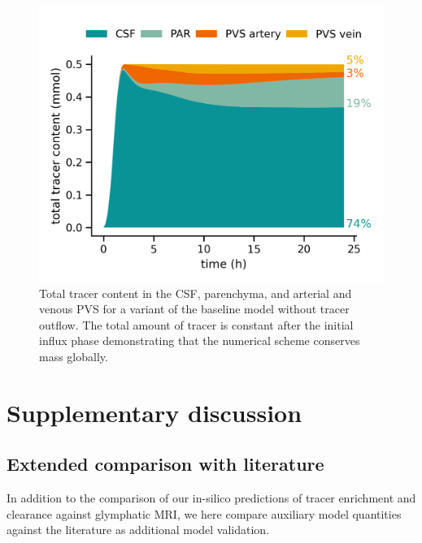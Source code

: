 \documentclass[fleqn,10pt]{wlscirep}
\begin{document}
\begin{figure}
    \centering
    \includegraphics[width=0.5\linewidth]{figures/modelAMassConservation_total_conc.png}
    \caption{Total tracer content in the CSF, parenchyma, and arterial and venous PVS for a variant of the baseline model without tracer outflow. The total amount of tracer is constant after the initial influx phase demonstrating that the numerical scheme conserves mass globally.}
    \label{fig:mass_conservation}
\end{figure}

\section{Supplementary discussion}

\subsection{Extended comparison with literature}
\label{sec:app:model_validation}

In addition to the comparison of our in-silico predictions of tracer
enrichment and clearance against glymphatic MRI, we here compare
auxiliary model quantities against the literature as additional model
validation.
\end{document}
